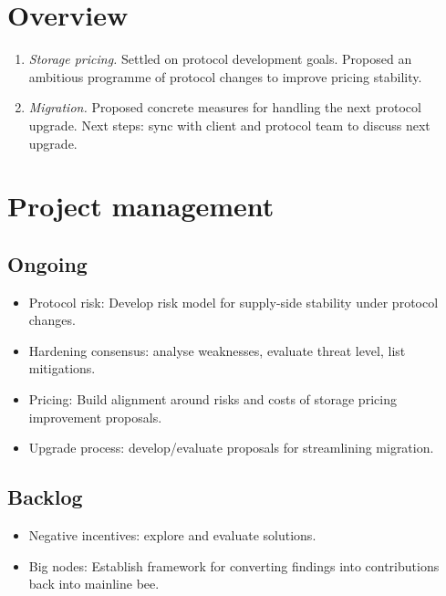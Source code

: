 \maketitle
\section*{Overview}

\begin{enumerate}
  \item \emph{Storage pricing.} Settled on protocol development goals. Proposed an ambitious programme of protocol changes to improve pricing stability.
  \item \emph{Migration.} Proposed concrete measures for handling the next protocol upgrade. Next steps: sync with client and protocol team to discuss next upgrade.
\end{enumerate}

\section*{Project management}

\subsection*{Ongoing}

\begin{itemize}
  \item Protocol risk: Develop risk model for supply-side stability under protocol changes.
  \item Hardening consensus: analyse weaknesses, evaluate threat level, list mitigations.
  \item Pricing: Build alignment around risks and costs of storage pricing improvement proposals. 
  \item Upgrade process: develop/evaluate proposals for streamlining migration.
\end{itemize}

\subsection*{Backlog}
\begin{itemize}
  \item Negative incentives: explore and evaluate solutions.
  \item Big nodes: Establish framework for converting findings into contributions back into mainline bee.
\end{itemize}


